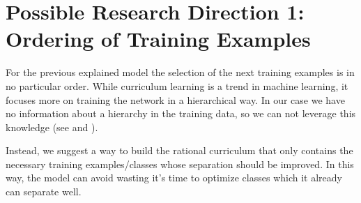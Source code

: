 \section{Possible Research Direction 1: Ordering of Training Examples}
For the previous explained model the selection of the next training examples is in no particular order. While curriculum learning is a trend in machine learning, it focuses more on training the network in a hierarchical way. In our case we have no information about a hierarchy in the training data, so we can not leverage this knowledge (see \cite{bengio2009curriculum} and \cite{graves2017automated}).

Instead, we suggest a way to build the rational curriculum that only contains the necessary training examples/classes whose separation should be improved. In this way, the model can avoid wasting it’s time to optimize classes which it already can separate well.

